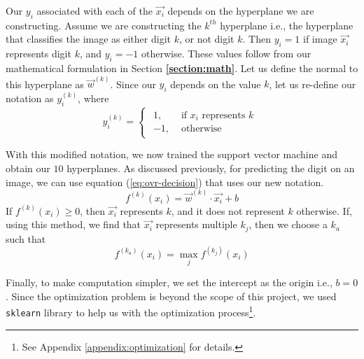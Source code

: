 Our ${y_i}$ associated with each of the $\vec{x_i}$ depends on the hyperplane we are constructing. Assume we are constructing the $k^{th}$ hyperplane i.e., the hyperplane that classifies the image as either digit $k$, or not digit $k$. Then $y_i = 1$ if image $\vec{x_i}$ represents digit $k$, and $y_i = -1$ otherwise. These values follow from our mathematical formulation in Section \textbf{\ref{section:math}}. Let us define the normal to this hyperplane as $\vec{w}^{(k)}$. Since our $y_i$ depends on the value $k$, let us re-define our notation as $y^{(k)}_i$, where
\begin{equation*}
    y^{(k)}_i= 
\begin{cases}
\begin{aligned}
 1,& \text{ if } x_i \text{ represents } k\\
-1,              & \text{ otherwise}
\end{aligned}
\end{cases}
\end{equation*}

With this modified notation, we now trained the support vector machine and obtain our $10$ hyperplanes. As discussed previously, for predicting the digit on an image, we can use equation (\ref{eq:ovr-decision}) that uses our new notation.
\begin{equation}
	f^{(k)}(x_i) = \vec{w}^{(k)}\cdot\vec{x_i} + b \label{eq:ovr-decision}
\end{equation}
If $f^{(k)}(x_i) \geq 0$, then $\vec{x_i}$ represents $k$, and it does not represent $k$ otherwise. If, using this method, we find that $\vec{x_i}$ represents multiple $k_j$, then we choose a $k_a$ such that
\begin{equation*}
	f^{(k_a)}(x_i) = \max_{j} f^{(k_j)}(x_i)  \label{eq:ovr-conflict}
\end{equation*}

Finally, to make computation simpler, we set the intercept as the origin i.e., $b = 0$. Since the optimization problem is beyond the scope of this project, we used \texttt{sklearn}\cite{scikit-learn} library to help us with the optimization process\footnote{See Appendix \ref{appendix:optimization} for details.}.